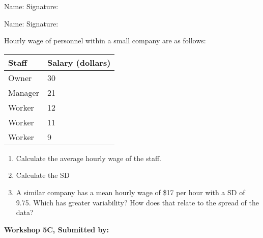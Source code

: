 \documentclass[11pt]{book}\usepackage[]{graphicx}\usepackage[]{color}
\begin{document}
\begin{exercises}
\begin{exercise}
\begin{center}
{{\vspace{4mm}
Name: \underline{\phantom{xxxxxxxxxxxxxxxxxxxxxxxx}} Signature: \underline{\phantom{xxxxxxxxxxxxxxxxxxxxxxxx}}

\vspace{4mm}
Name: \underline{\phantom{xxxxxxxxxxxxxxxxxxxxxxxx}} Signature: \underline{\phantom{xxxxxxxxxxxxxxxxxxxxxxxx}}
 }}
\end{center}

Hourly wage of personnel within a small company are as follows:

\begin{tabular}{@{} ll @{}} \hline
Staff	&	Salary (dollars) \\ \hline
Owner		& 30 \\
Manager	& 21 \\
Worker	& 12 \\
Worker	& 11 \\
Worker	& 9 \\ \hline
\end{tabular}

\begin{enumerate}
  \item Calculate the average hourly wage of the staff.
  \item Calculate the SD
  \item A similar company has a mean hourly wage of \$17 per hour with a SD of 9.75.  Which has greater variability?  How does that relate to the spread of the data?
\end{enumerate}

\end{exercise}
\begin{solution}  %

\end{solution}

\clearpage

    \begin{exercise}  %

    \begin{center}
\begin{flushleft}\textbf{\large \hfill Workshop 5C, Submitted by: }\end{flushleft}

\end{center}
\end{exercise}
\end{exercises}
\end{document}
